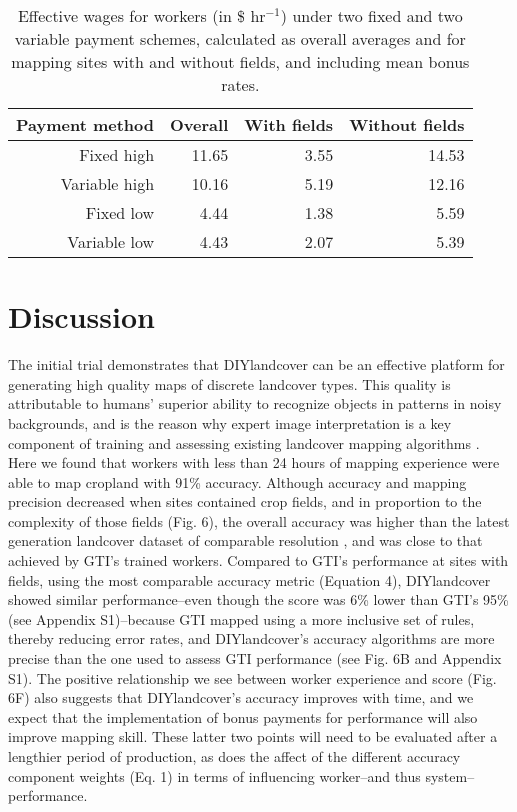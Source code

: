 \documentclass[preprint,12pt,authoryear]{elsarticle}
\begin{document}
\begin{table}[htdp]
  \caption{Effective wages for workers (in \$ hr$^{-1}$) under two fixed and two variable payment schemes, calculated as overall averages and for mapping sites with and without fields, and including mean bonus rates. }
  \centering
  \begin{tabular}{rrrr}
    \hline
    Payment method  & Overall & With fields & Without fields \\ 
   \hline
    Fixed high & 11.65 & 3.55 & 14.53 \\ 
    Variable high & 10.16 & 5.19 & 12.16 \\ 
    Fixed low & 4.44 & 1.38 & 5.59 \\ 
    Variable low & 4.43 & 2.07 & 5.39 \\ 
   \hline
  \end{tabular}
\end{table}

\section{Discussion}
The initial trial demonstrates that DIYlandcover can be an effective platform for generating high quality maps of discrete landcover types. This quality is attributable to humans' superior ability to recognize objects in patterns in noisy backgrounds, and is the reason why expert image interpretation is a key component of training and assessing existing landcover mapping algorithms \citep[e.g.][]{fritz_cropland_2011,fritz_geo-wiki:_2012,hansen_high-resolution_2013}. Here we found that workers with less than 24 hours of mapping experience were able to map cropland with 91\% accuracy. Although accuracy and mapping precision decreased when sites contained crop fields, and in proportion to the complexity of those fields (Fig. 6), the overall accuracy was higher than the latest generation landcover dataset of comparable resolution \citep[82\%;][]{fritz_mapping_2015}, and was close to that achieved by GTI's trained workers. Compared to GTI's performance at sites with fields, using the most comparable accuracy metric (Equation 4), DIYlandcover showed similar performance--even though the score was 6\% lower than GTI's 95\% (see Appendix S1)--because GTI mapped using a more inclusive set of rules, thereby reducing error rates, and DIYlandcover's accuracy algorithms are more precise than the one used to assess GTI performance (see Fig. 6B and Appendix S1). The positive relationship we see between worker experience and score (Fig. 6F) also suggests that DIYlandcover's accuracy improves with time, and we expect that the implementation of bonus payments for performance will also improve mapping skill. These latter two points will need to be evaluated after a lengthier period of production, as does the affect of the different accuracy component weights (Eq. 1) in terms of influencing worker--and thus system--performance. 
\end{document}
